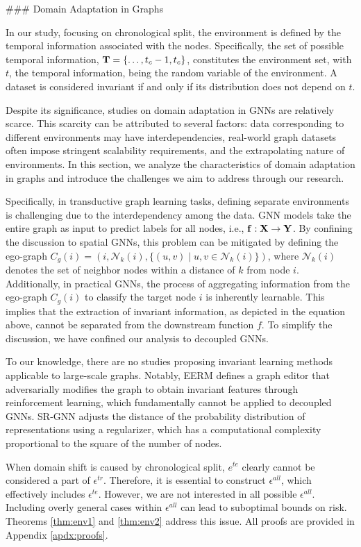 ### Domain Adaptation in Graphs

In our study, focusing on chronological split, the environment is defined by the temporal information associated with the nodes. Specifically, the set of possible temporal information, $\bold{T}=\{\dots, t_{c}-1, t_{c}\}$, constitutes the environment set, with $t$, the temporal information, being the random variable of the environment. A dataset is considered invariant if and only if its distribution does not depend on $t$.

Despite its significance, studies on domain adaptation in GNNs are relatively scarce. This scarcity can be attributed to several factors: data corresponding to different environments may have interdependencies, real-world graph datasets often impose stringent scalability requirements, and the extrapolating nature of environments. In this section, we analyze the characteristics of domain adaptation in graphs and introduce the challenges we aim to address through our research.

Specifically, in transductive graph learning tasks, defining separate environments is challenging due to the interdependency among the data. GNN models take the entire graph as input to predict labels for all nodes, i.e., $\bold{f} : \bold{X} \rightarrow \bold{Y}$. By confining the discussion to spatial GNNs, this problem can be mitigated by defining the ego-graph $C_g(i) = \left(i, \mathcal{N}_k(i), \{(u,v) \mid u,v \in \mathcal{N}_k(i)\}\right)$, where $\mathcal{N}_k(i)$ denotes the set of neighbor nodes within a distance of $k$ from node $i$. Additionally, in practical GNNs, the process of aggregating information from the ego-graph $C_g(i)$ to classify the target node $i$ is inherently learnable. This implies that the extraction of invariant information, as depicted in the equation above, cannot be separated from the downstream function $f$. To simplify the discussion, we have confined our analysis to decoupled GNNs.

To our knowledge, there are no studies proposing invariant learning methods applicable to large-scale graphs. Notably, EERM \cite{wu2022handling} defines a graph editor that adversarially modifies the graph to obtain invariant features through reinforcement learning, which fundamentally cannot be applied to decoupled GNNs. SR-GNN \cite{shift_robust} adjusts the distance of the probability distribution of representations using a regularizer, which has a computational complexity proportional to the square of the number of nodes.

When domain shift is caused by chronological split, $e^{te}$ clearly cannot be considered a part of $\epsilon^{tr}$. Therefore, it is essential to construct $\epsilon^{all}$, which effectively includes $\epsilon^{te}$. However, we are not interested in all possible $\epsilon^{all}$. Including overly general cases within $\epsilon^{all}$ can lead to suboptimal bounds on risk. Theorems \ref{thm:env1} and \ref{thm:env2} address this issue. All proofs are provided in Appendix \ref{apdx:proofs}.